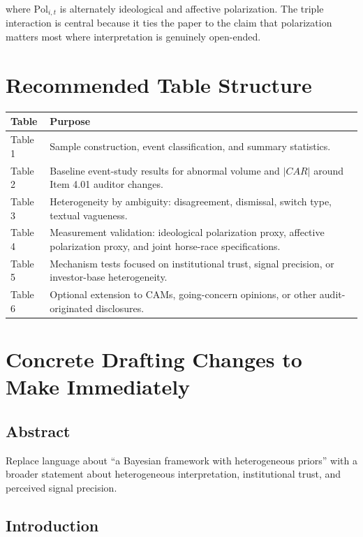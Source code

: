 \documentclass[12pt]{article}
\begin{document}
where $\text{Pol}_{i,t}$ is alternately ideological and affective polarization. The triple interaction is central because it ties the paper to the claim that polarization matters most where interpretation is genuinely open-ended.

\section{Recommended Table Structure}

\begin{longtable}{p{} p{}}
\toprule
\textbf{Table} & \textbf{Purpose} \\
\midrule
Table 1 & Sample construction, event classification, and summary statistics. \\
Table 2 & Baseline event-study results for abnormal volume and $|CAR|$ around Item 4.01 auditor changes. \\
Table 3 & Heterogeneity by ambiguity: disagreement, dismissal, switch type, textual vagueness. \\
Table 4 & Measurement validation: ideological polarization proxy, affective polarization proxy, and joint horse-race specifications. \\
Table 5 & Mechanism tests focused on institutional trust, signal precision, or investor-base heterogeneity. \\
Table 6 & Optional extension to CAMs, going-concern opinions, or other audit-originated disclosures. \\
\bottomrule
\end{longtable}

\section{Concrete Drafting Changes to Make Immediately}

\subsection{Abstract}

Replace language about ``a Bayesian framework with heterogeneous priors'' with a broader statement about heterogeneous interpretation, institutional trust, and perceived signal precision.

\subsection{Introduction}
\end{document}
